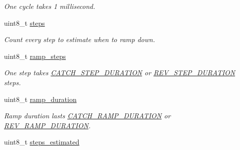 \begin{CompactItemize}
\begin{CompactList}\small\item\em One cycle takes 1 millisecond. \item\end{CompactList}\item 
\hypertarget{structstepper__motor__t_c9eccf8cef29d07f43317c0814d821f2}{
uint8\_\-t \hyperlink{structstepper__motor__t_c9eccf8cef29d07f43317c0814d821f2}{steps}}
\label{structstepper__motor__t_c9eccf8cef29d07f43317c0814d821f2}

\begin{CompactList}\small\item\em Count every step to estimate when to ramp down. \item\end{CompactList}\item 
\hypertarget{structstepper__motor__t_271f73d7af7fc3c94994448d9e3ab811}{
uint8\_\-t \hyperlink{structstepper__motor__t_271f73d7af7fc3c94994448d9e3ab811}{ramp\_\-steps}}
\label{structstepper__motor__t_271f73d7af7fc3c94994448d9e3ab811}

\begin{CompactList}\small\item\em One step takes \hyperlink{system_8h_09bccded49054a78a07e0d63439e9963}{CATCH\_\-STEP\_\-DURATION} or \hyperlink{system_8h_a2e7a288930ea3e5c40dd46d9710c3c4}{REV\_\-STEP\_\-DURATION} steps. \item\end{CompactList}\item 
\hypertarget{structstepper__motor__t_54b0e9b52201abc53290a49adf99412a}{
uint8\_\-t \hyperlink{structstepper__motor__t_54b0e9b52201abc53290a49adf99412a}{ramp\_\-duration}}
\label{structstepper__motor__t_54b0e9b52201abc53290a49adf99412a}

\begin{CompactList}\small\item\em Ramp duration lasts \hyperlink{system_8h_6ef7e4171ad6c94755cb69dfb84ee6e6}{CATCH\_\-RAMP\_\-DURATION} or \hyperlink{system_8h_16f46929c8f14df1763fdaab4f10a51d}{REV\_\-RAMP\_\-DURATION}. \item\end{CompactList}\item 
\hypertarget{structstepper__motor__t_0ed248c8aa0519d4f46c1138c6d56cc1}{
uint8\_\-t \hyperlink{structstepper__motor__t_0ed248c8aa0519d4f46c1138c6d56cc1}{steps\_\-estimated}}
\label{structstepper__motor__t_0ed248c8aa0519d4f46c1138c6d56cc1}


\end{CompactItemize}
